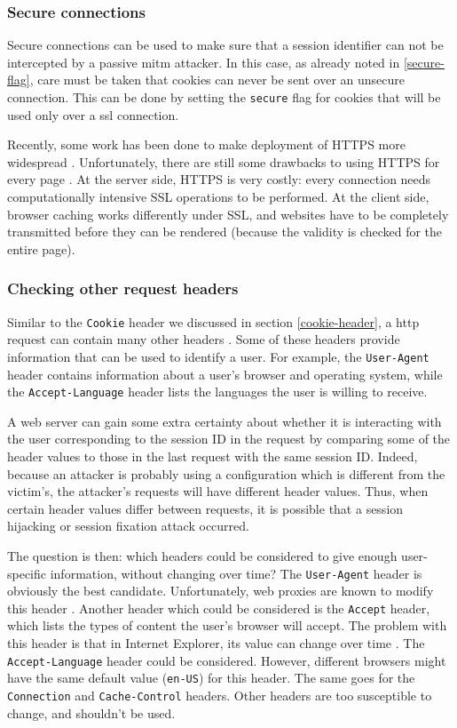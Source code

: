 \subsubsection{Secure connections}\label{ssl}

Secure connections can be used to make sure that a session identifier can not be intercepted by a passive \gls{mitm} attacker. In this case, as already noted in \ref{secure-flag}, care must be taken that cookies can never be sent over an unsecure connection. This can be done by setting the \texttt{secure} flag for cookies that will be used only over a \gls{ssl} connection.

Recently, some work has been done to make deployment of HTTPS more widespread \cite{Hodges2010,Jackson2008}. Unfortunately, there are still some drawbacks to using HTTPS for every page \cite{Adida2008}. At the server side, HTTPS is very costly: every connection needs computationally intensive SSL operations to be performed. At the client side, browser caching works differently under SSL, and websites have to be completely transmitted before they can be rendered (because the validity is checked for the entire page).

\subsubsection{Checking other request headers}

Similar to the \texttt{Cookie} header we discussed in section \ref{cookie-header}, a \gls{http} request can contain many other headers \cite{rfc2616}. Some of these headers provide information that can be used to identify a user. For example, the \texttt{User-Agent} header contains information about a user's browser and operating system, while the \texttt{Accept-Language} header lists the languages the user is willing to receive.

A web server can gain some extra certainty about whether it is interacting with the user corresponding to the session ID in the request by comparing some of the header values to those in the last request with the same session ID. Indeed, because an attacker is probably using a configuration which is different from the victim's, the attacker's requests will have different header values. Thus, when certain header values differ between requests, it is possible that a session hijacking or session fixation attack occurred.

The question is then: which headers could be considered to give enough user-specific information, without changing over time? The \texttt{User-Agent} header is obviously the best candidate. Unfortunately, web proxies are known to modify this header \cite{ShiflettHijacking}. Another header which could be considered is the \texttt{Accept} header, which lists the types of content the user's browser will accept. The problem with this header is that in Internet Explorer, its value can change over time \cite{ShiflettHijacking}. The \texttt{Accept-Language} header could be considered. However, different browsers might have the same default value (\texttt{en-US}) for this header. The same goes for the \texttt{Connection} and \texttt{Cache-Control} headers. Other headers are too susceptible to change, and shouldn't be used.

